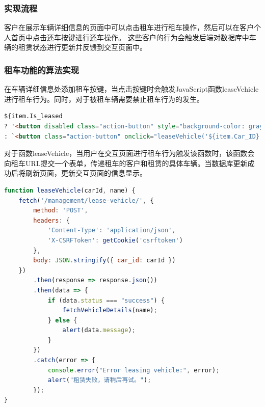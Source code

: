 \documentclass[UTF8,a4paper,12pt]{ctexart}
\begin{document}
\subsubsection{实现流程}
客户在展示车辆详细信息的页面中可以点击租车进行租车操作，然后可以在客户个人首页中点击还车按键进行还车操作。
这些客户的行为会触发后端对数据库中车辆的租赁状态进行更新并反馈到交互页面中。
\subsubsection{租车功能的算法实现}
在车辆详细信息处添加租车按键，当点击按键时会触发JavaScript函数leaseVehicle进行租车行为。同时，对于被租车辆需要禁止租车行为的发生。
\begin{lstlisting}[language=HTML]
${item.Is_leased
? '<button disabled class="action-button" style="background-color: gray; cursor: not-allowed;">已租赁</button>'
: `<button class="action-button" onclick="leaseVehicle('${item.Car_ID}', '${name}')">租赁</button>`}
\end{lstlisting}

对于函数leaseVehicle，当用户在交互页面进行租车行为触发该函数时，该函数会向租车URL提交一个表单，传递租车的客户和租赁的具体车辆。当数据库更新成功后将刷新页面，更新交互页面的信息显示。
\begin{lstlisting}[language=JavaScript]
function leaseVehicle(carId, name) {
    fetch('/management/lease-vehicle/', {
        method: 'POST',
        headers: {
            'Content-Type': 'application/json',
            'X-CSRFToken': getCookie('csrftoken') 
        },
        body: JSON.stringify({ car_id: carId })  
    })
        .then(response => response.json())
        .then(data => {
            if (data.status === "success") {
                fetchVehicleDetails(name); 
            } else {
                alert(data.message); 
            }
        })
        .catch(error => {
            console.error("Error leasing vehicle:", error);
            alert("租赁失败，请稍后再试。");
        });
}
\end{lstlisting}
\end{document}
